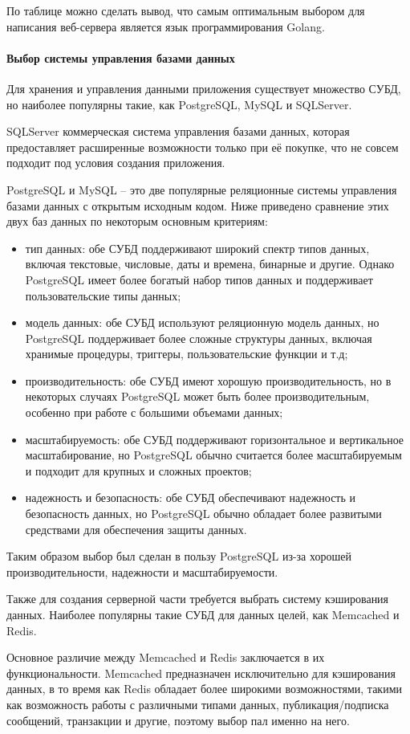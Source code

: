 По таблице можно сделать вывод, что самым оптимальным выбором для
написания веб-сервера является язык программирования Golang.

\newpage
\paragraph{Выбор системы управления базами данных}

Для хранения и управления данными приложения существует множество СУБД,
но наиболее популярны такие, как PostgreSQL, MySQL и SQLServer.

SQLServer коммерческая система управления базами данных, которая предоставляет
расширенные возможности только при её покупке, что не совсем подходит под
условия создания приложения.

PostgreSQL и MySQL – это две популярные реляционные системы управления базами данных с
открытым исходным кодом. Ниже приведено сравнение этих двух баз данных
по некоторым основным критериям:
\begin{itemize}
	\item тип данных: обе СУБД поддерживают широкий спектр
	      типов данных, включая текстовые, числовые, даты и времена, бинарные и
	      другие. Однако PostgreSQL имеет более богатый набор типов данных и
	      поддерживает пользовательские типы данных;

	\item модель данных: обе СУБД используют реляционную
	      модель данных, но PostgreSQL поддерживает более сложные структуры
	      данных, включая хранимые процедуры, триггеры, пользовательские функции
	      и т.д;

	\item производительность: обе СУБД имеют хорошую
	      производительность, но в некоторых случаях PostgreSQL может быть более
	      производительным, особенно при работе с большими объемами данных;

	\item масштабируемость: обе СУБД поддерживают
	      горизонтальное и вертикальное масштабирование, но PostgreSQL обычно
	      считается более масштабируемым и подходит для крупных и сложных
	      проектов;

	\item надежность и безопасность: обе СУБД обеспечивают
	      надежность и безопасность данных, но PostgreSQL обычно обладает более
	      развитыми средствами для обеспечения защиты данных.
\end{itemize}

Таким образом выбор был сделан в пользу PostgreSQL из-за хорошей
производительности, надежности и масштабируемости.

Также для создания серверной части требуется выбрать систему
кэширования данных. Наиболее популярны такие СУБД для данных
целей, как Memcached и Redis.

Основное различие между Memcached и Redis заключается в их
функциональности. Memcached предназначен исключительно для
кэширования данных, в то время как Redis обладает более широкими
возможностями, такими как возможность работы с различными типами
данных, публикация/подписка сообщений, транзакции и другие, поэтому
выбор пал именно на него.

